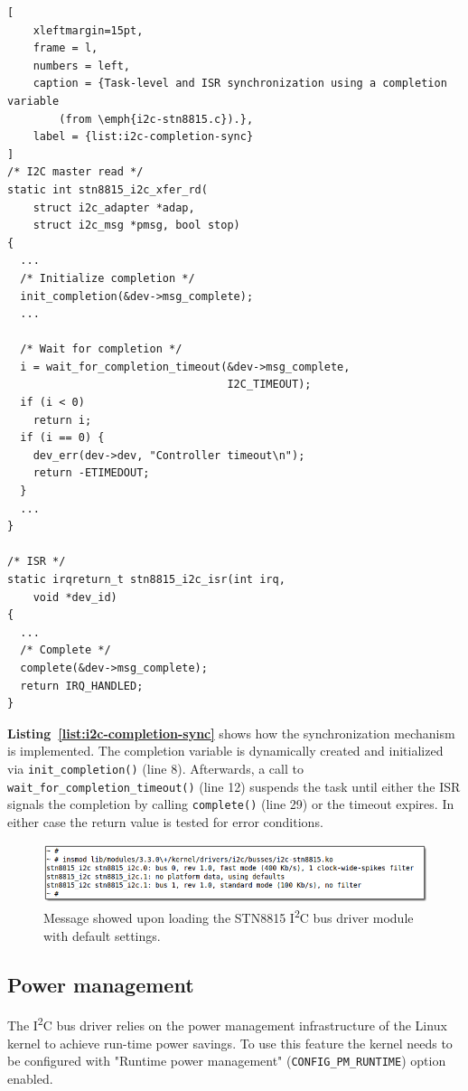 \documentclass[a4paper,10pt]{article}
\newcommand{\iic}{I\textsuperscript{2}C }
\newcommand{\keyword}[1]{\texttt{#1}}
\newcommand{\refl}[1]{\textbf{Listing~\ref{#1}}}
\begin{document}
\begin{multicols}{2}
\begin{lstlisting}[
	xleftmargin=15pt,
	frame = l,
	numbers = left,
	caption = {Task-level and ISR synchronization using a completion variable
		(from \emph{i2c-stn8815.c}).},
	label = {list:i2c-completion-sync}
]
/* I2C master read */
static int stn8815_i2c_xfer_rd(
    struct i2c_adapter *adap,
    struct i2c_msg *pmsg, bool stop)
{
  ...
  /* Initialize completion */
  init_completion(&dev->msg_complete);
  ...

  /* Wait for completion */
  i = wait_for_completion_timeout(&dev->msg_complete,
                                  I2C_TIMEOUT);
  if (i < 0)
    return i;
  if (i == 0) {
    dev_err(dev->dev, "Controller timeout\n");
    return -ETIMEDOUT;
  }
  ...
}

/* ISR */
static irqreturn_t stn8815_i2c_isr(int irq,
	void *dev_id)
{
  ...
  /* Complete */
  complete(&dev->msg_complete);
  return IRQ_HANDLED;
}
\end{lstlisting}

\refl{list:i2c-completion-sync} shows how the synchronization
mechanism is implemented.
The completion variable is dynamically created and initialized via
\keyword{init\_completion()} (line 8). Afterwards, a call to
\keyword{wait\_for\_completion\_timeout()} (line 12) suspends the task until
either the ISR signals the completion by calling \keyword{complete()} (line 29)
or the timeout expires.  In either case the return value is tested for error
conditions.

\begin{figure}[t]
 \includegraphics[width=12.4cm, height=1.7cm]{./figures/dump-adapter-insmod.png}
 \caption{Message showed upon loading the STN8815 \iic bus driver module with
 	default settings.}
 \label{fig:i2c-adapter-insmod}
\end{figure}


\subsection{Power management}
\label{sec:adapter_power_management}

The \iic bus driver relies on the power management infrastructure of the Linux
kernel to achieve run-time power savings. To use this feature the kernel needs
to be configured with "Runtime power management" (\keyword{CONFIG\_PM\_RUNTIME})
option enabled.


\end{multicols}
\end{document}
